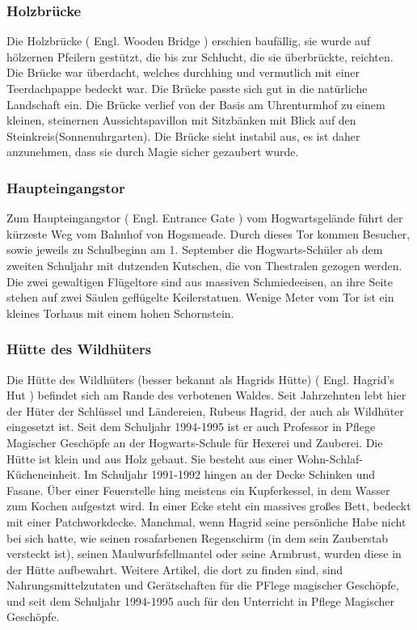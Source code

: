 \documentclass[a4paper, 10pt]{article}
\begin{document}
\subsubsection*{\large Holzbrücke}
Die Holzbrücke (  Engl.  Wooden Bridge ) erschien baufällig, sie wurde auf hölzernen Pfeilern gestützt, die bis zur Schlucht, die sie überbrückte, reichten. Die Brücke war überdacht, welches durchhing und vermutlich mit einer Teerdachpappe bedeckt war. Die Brücke passte sich gut in die natürliche Landschaft ein.
\vspace{10pt}
\newline
{}  
Die Brücke verlief von der Basis am Uhrenturmhof zu einem kleinen, steinernen Aussichtspavillon mit Sitzbänken mit Blick auf den Steinkreis(Sonnenuhrgarten). Die Brücke sieht instabil aus, es ist daher anzunehmen, dass sie durch Magie sicher gezaubert wurde.

\subsubsection*{\large Haupteingangstor}
Zum Haupteingangstor (  Engl.  Entrance Gate ) vom Hogwartsgelände führt der kürzeste Weg vom Bahnhof von Hogsmeade. Durch dieses Tor kommen Besucher, sowie jeweils zu Schulbeginn am 1. September die Hogwarts-Schüler ab dem zweiten Schuljahr mit dutzenden Kutschen, die von Thestralen gezogen werden. Die zwei gewaltigen Flügeltore sind aus massiven Schmiedeeisen, an ihre Seite stehen auf zwei Säulen geflügelte Keilerstatuen. Wenige Meter vom Tor ist ein kleines Torhaus mit einem hohen Schornstein.
\subsubsection*{\large Hütte des Wildhüters}
Die Hütte des Wildhüters (besser bekannt als Hagrids Hütte) (  Engl.  Hagrid's Hut ) befindet sich am Rande des verbotenen Waldes. Seit Jahrzehnten lebt hier der Hüter der Schlüssel und Ländereien, Rubeus Hagrid, der auch als Wildhüter eingesetzt ist. Seit dem Schuljahr 1994-1995 ist er auch Professor in Pflege Magischer Geschöpfe an der Hogwarts-Schule für Hexerei und Zauberei.
\vspace{10pt}
\newline
{}  
Die Hütte ist klein und aus Holz gebaut. Sie besteht aus einer Wohn-Schlaf-Kücheneinheit. Im Schuljahr 1991-1992 hingen an der Decke Schinken und Fasane. Über einer Feuerstelle hing meistens ein Kupferkessel, in dem Wasser zum Kochen aufgestzt wird. In einer Ecke steht ein massives großes Bett, bedeckt mit einer Patchworkdecke. Manchmal, wenn Hagrid seine persönliche Habe nicht bei sich hatte, wie seinen rosafarbenen Regenschirm (in dem sein Zauberstab versteckt ist), seinen Maulwurfsfellmantel oder seine Armbrust, wurden diese in der Hütte aufbewahrt. Weitere Artikel, die dort zu finden sind, sind Nahrungsmittelzutaten und Gerätschaften für die PFlege magischer Geschöpfe, und seit dem Schuljahr 1994-1995 auch für den Unterricht in Pflege Magischer Geschöpfe.
\end{document}
